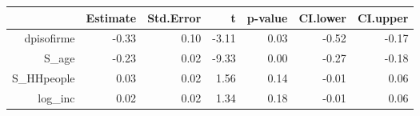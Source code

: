 \begin{table}[ht]
\centering
\begin{tabular}{rrrrrrr}
  \hline
 & Estimate & Std.Error & t & p-value & CI.lower & CI.upper \\ 
  \hline
dpisofirme & -0.33 & 0.10 & -3.11 & 0.03 & -0.52 & -0.17 \\ 
  S\_age & -0.23 & 0.02 & -9.33 & 0.00 & -0.27 & -0.18 \\ 
  S\_HHpeople & 0.03 & 0.02 & 1.56 & 0.14 & -0.01 & 0.06 \\ 
  log\_inc & 0.02 & 0.02 & 1.34 & 0.18 & -0.01 & 0.06 \\ 
   \hline
\end{tabular}
\end{table}
